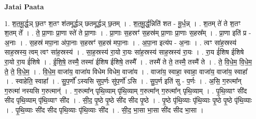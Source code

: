 \documentclass[17pt]{extarticle}
\begin{document}
\textbf{Jatai Paata} \newline

1. श॒त॒मू॒र्द्ध॒ञ् छ॒तꣳ श॒तꣳ श॑तमूर्द्धञ् छतमूर्द्धञ् छ॒तम् । . श॒त॒मू॒र्द्ध॒न्निति॑ शत - मू॒र्ध॒न्न् । . श॒तम् ते॑ ते श॒तꣳ श॒तम् ते᳚ । . ते॒ प्रा॒णाः प्रा॒णा स्ते॑ ते प्रा॒णाः । . प्रा॒णाः स॒हस्रꣳ॑ स॒हस्र॑म् प्रा॒णाः प्रा॒णाः स॒हस्र᳚म् । . प्रा॒णा इति॑ प्र - अ॒नाः । . स॒हस्र॑ मपा॒ना अ॑पा॒नाः स॒हस्रꣳ॑ स॒हस्र॑ मपा॒नाः । . अ॒पा॒ना इत्य॑प - अ॒नाः । . त्वꣳ सा॑ह॒स्रस्य॑ साह॒स्रस्य॒ त्वम् त्वꣳ सा॑ह॒स्रस्य॑ । . सा॒ह॒स्रस्य॑ रा॒यो रा॒यः सा॑ह॒स्रस्य॑ साह॒स्रस्य॑ रा॒यः । . रा॒य ई॑शिष ईशिषे रा॒यो रा॒य ई॑शिषे । . ई॒शि॒षे॒ तस्मै॒ तस्मा॑ ईशिष ईशिषे॒ तस्मै᳚ । . तस्मै॑ ते ते॒ तस्मै॒ तस्मै॑ ते । . ते॒ वि॒धे॒म॒ वि॒धे॒म॒ ते॒ ते॒ वि॒धे॒म॒ । . वि॒धे॒म॒ वाजा॑य॒ वाजा॑य विधेम विधेम॒ वाजा॑य । . वाजा॑य॒ स्वाहा॒ स्वाहा॒ वाजा॑य॒ वाजा॑य॒ स्वाहा᳚ । . स्वाहेति॒ स्वाहा᳚ । . सु॒प॒र्णो᳚ ऽस्यसि सुप॒र्णः सु॑प॒र्णो॑ ऽसि । . सु॒प॒र्ण इति॑ सु - प॒र्णः । . अ॒सि॒ ग॒रुत्मा᳚न् ग॒रुत्मा॑ नस्यसि ग॒रुत्मान्॑ । . ग॒रुत्मा᳚न् पृथि॒व्याम् पृ॑थि॒व्याम् ग॒रुत्मा᳚न् ग॒रुत्मा᳚न् पृथि॒व्याम् । . पृ॒थि॒व्याꣳ सी॑द सीद पृथि॒व्याम् पृ॑थि॒व्याꣳ सी॑द । . सी॒द॒ पृ॒ष्ठे पृ॒ष्ठे सी॑द सीद पृ॒ष्ठे । . पृ॒ष्ठे पृ॑थि॒व्याः पृ॑थि॒व्याः पृ॒ष्ठे पृ॒ष्ठे पृ॑थि॒व्याः । . पृ॒थि॒व्याः सी॑द सीद पृथि॒व्याः पृ॑थि॒व्याः सी॑द । . सी॒द॒ भा॒सा भा॒सा सी॑द सीद भा॒सा । \newline
\end{document}
